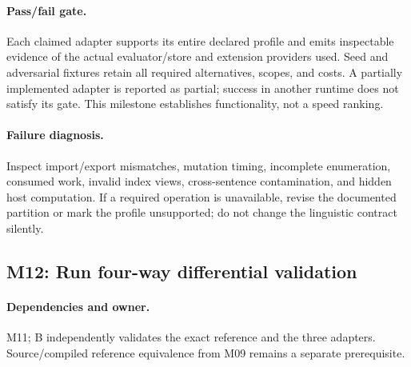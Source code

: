 \documentclass[11pt,a4paper]{article}
\begin{document}
\paragraph{Pass/fail gate.} Each claimed adapter supports its entire declared
profile and emits inspectable evidence of the actual evaluator/store and
extension providers used. Seed and adversarial fixtures retain
all required alternatives, scopes, and costs. A partially implemented adapter
is reported as partial; success in another runtime does not satisfy its gate.
This milestone establishes functionality, not a speed ranking.

\paragraph{Failure diagnosis.} Inspect import/export mismatches, mutation
timing, incomplete enumeration, consumed work, invalid index views,
cross-sentence contamination, and hidden host computation. If a required
operation is unavailable, revise the documented partition or mark the
profile unsupported; do not change the linguistic contract silently.

\subsection{M12: Run four-way differential validation}

\paragraph{Dependencies and owner.} M11; B independently validates the exact
reference and the three adapters. Source/compiled reference equivalence from
M09 remains a separate prerequisite.
\end{document}

